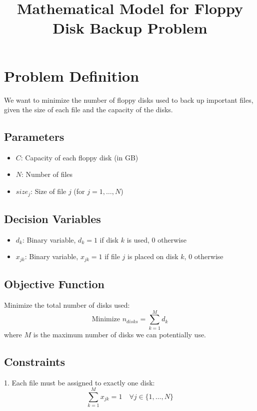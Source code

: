 \documentclass{article}
\begin{document}
\title{Mathematical Model for Floppy Disk Backup Problem}
\author{}
\date{}
\maketitle

\section*{Problem Definition}

We want to minimize the number of floppy disks used to back up important files, given the size of each file and the capacity of the disks.

\subsection*{Parameters}
\begin{itemize}
    \item $C$: Capacity of each floppy disk (in GB)
    \item $N$: Number of files
    \item $size_j$: Size of file $j$ (for $j = 1, \ldots, N$)
\end{itemize}

\subsection*{Decision Variables}
\begin{itemize}
    \item $d_k$: Binary variable, $d_k = 1$ if disk $k$ is used, $0$ otherwise
    \item $x_{jk}$: Binary variable, $x_{jk} = 1$ if file $j$ is placed on disk $k$, $0$ otherwise
\end{itemize}

\subsection*{Objective Function}
Minimize the total number of disks used:
\[
\text{Minimize } n_{disks} = \sum_{k=1}^{M} d_k
\]
where $M$ is the maximum number of disks we can potentially use.

\subsection*{Constraints}
1. Each file must be assigned to exactly one disk:
\[
\sum_{k=1}^{M} x_{jk} = 1 \quad \forall j \in \{1, \ldots, N\}
\]
\end{document}
